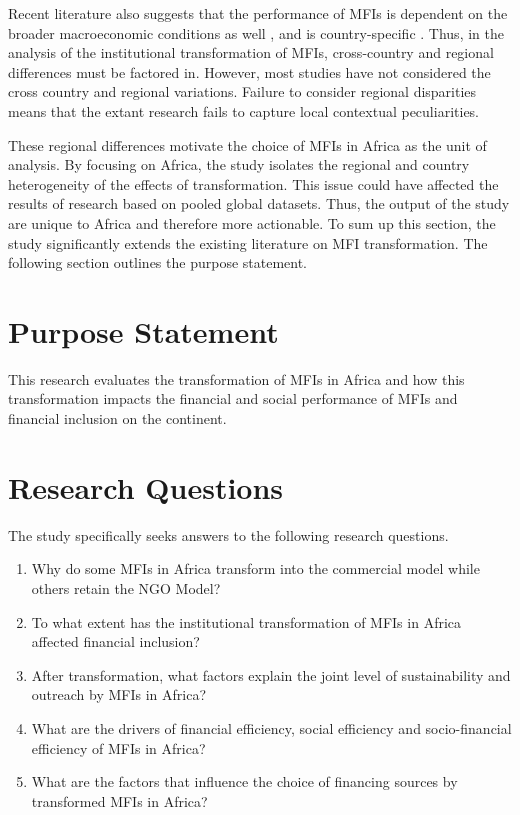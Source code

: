 \documentclass[a4paper, nobind]{templates/ociamthesis}
\providecommand{\tightlist}{%
  \setlength{\itemsep}{0pt}\setlength{\parskip}{0pt}}
\begin{document}
Recent literature also suggests that the performance of MFIs is dependent on the broader macroeconomic conditions as well \textcite{ahlin2011does}, and is country-specific \autocite{d2017ngos}. Thus, in the analysis of the institutional transformation of MFIs, cross-country and regional differences must be factored in. However, most studies have not considered the cross country and regional variations. Failure to consider regional disparities means that the extant research fails to capture local contextual peculiarities.

These regional differences motivate the choice of MFIs in Africa as the unit of analysis. By focusing on Africa, the study isolates the regional and country heterogeneity of the effects of transformation. This issue could have affected the results of research based on pooled global datasets. Thus, the output of the study are unique to Africa and therefore more actionable. To sum up this section, the study significantly extends the existing literature on MFI transformation. The following section outlines the purpose statement.

\hypertarget{purpose-statement}{%
\section{Purpose Statement}\label{purpose-statement}}

\noindent This research evaluates the transformation of MFIs in Africa and how this transformation impacts the financial and social performance of MFIs and financial inclusion on the continent.

\hypertarget{research-questions}{%
\section{Research Questions}\label{research-questions}}

\noindent The study specifically seeks answers to the following research questions.

\begin{enumerate}
\def\labelenumi{\arabic{enumi}.}
\tightlist
\item
  Why do some MFIs in Africa transform into the commercial model while others retain the NGO Model?
\item
  To what extent has the institutional transformation of MFIs in Africa affected financial inclusion?
\item
  After transformation, what factors explain the joint level of sustainability and outreach by MFIs in Africa?
\item
  What are the drivers of financial efficiency, social efficiency and socio-financial efficiency of MFIs in Africa?
\item
  What are the factors that influence the choice of financing sources by transformed MFIs in Africa?
\end{enumerate}
\end{document}
